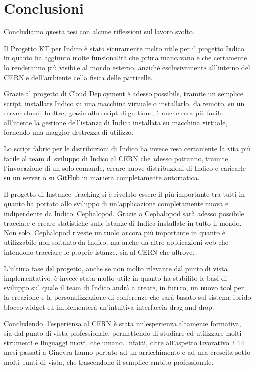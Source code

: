 \chapter{Conclusioni} \label{chap:conclusioni}

    Concludiamo questa tesi con alcune riflessioni sul lavoro svolto.
    
    Il Progetto KT per Indico è stato sicuramente molto utile per il progetto Indico in quanto ha aggiunto molte funzionalità che prima mancavano e che certamente lo renderanno più visibile al mondo esterno, anziché esclusivamente all'interno del \ac{CERN} e dell'ambiente della fisica delle particelle.
    
    Grazie al progetto di Cloud Deployment è adesso possibile, tramite un semplice script, installare Indico su una macchina virtuale o installarlo, da remoto, su un server cloud. Inoltre, grazie allo script di gestione, è anche resa più facile all'utente la gestione dell'istanza di Indico installata su macchina virtuale, fornendo una maggior destrezza di utilizzo.
    
    Lo script fabric per le distribuzioni di Indico ha invece reso certamente la vita più facile al team di sviluppo di Indico al \ac{CERN} che adesso potranno, tramite l'invocazione di un solo comando, creare nuove distribuzioni di Indico e caricarle su un server o su GitHub in maniera completamente automatica.
    
    Il progetto di Instance Tracking si è rivelato essere il più importante tra tutti in quanto ha portato allo sviluppo di un'applicazione completamente nuova e indipendente da Indico: Cephalopod. Grazie a Cephalopod sarà adesso possibile tracciare e creare statistiche sulle istanze di Indico installate in tutto il mondo. Non solo, Cephalopod riveste un ruolo ancora più importante in quanto è utilizzabile non soltanto da Indico, ma anche da altre applicazioni web che intendono tracciare le proprie istanze, sia al \ac{CERN} che altrove.
    
    L'ultima fase del progetto, anche se non molto rilevante dal punto di vista implementativo, è invece stata molto utile in quanto ha stabilito le basi di sviluppo sul quale il team di Indico andrà a creare, in futuro, un nuovo tool per la creazione e la personalizzazione di conferenze che sarà basato sul sistema ibrido blocco-widget ed implementerà un'intuitiva interfaccia drag-and-drop.
    
    Concludendo, l'esperienza al \ac{CERN} è stata un'esperienza altamente formativa, sia dal punto di vista professionale, permettendo di studiare ed utilizzare molti strumenti e linguaggi nuovi, che umano. Infatti, oltre all'aspetto lavorativo, i 14 mesi passati a Ginevra hanno portato ad un arricchimento e ad una crescita sotto molti punti di vista, che trascendono il semplice ambito professionale.
